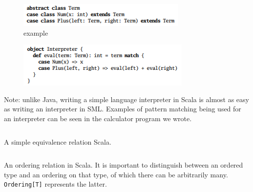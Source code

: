 \documentclass[jou,apacite]{IEEEtran}
\begin{document}
\begin{figure}[h]
  \centering
  \includegraphics[width=\columnwidth]{abstract_class}
  \caption{example}
  \label{fig:example}
\end{figure}

\begin{figure}[h]
  \centering
  \includegraphics[width=\columnwidth]{pattern_match}
  \caption{}
  \label{fig:example}
\end{figure}

Note: unlike Java, writing a simple language interpreter in Scala is almost as easy as writing an interpreter in SML. Examples of pattern matching being used for an interpreter can be seen in the calculator program we wrote.

\begin{listing}
  \inputminted[firstline=3, frame=single]{Scala}{../examples/Equiv.scala}
  \caption{A simple equivalence relation Scala.}
  \label{lst:equiv}
\end{listing}

\begin{listing}
  \inputminted[firstline=3, frame=single]{Scala}{../examples/Ord.scala}
  \caption{An ordering relation in Scala. It is important to distinguish between
    an ordered type and an ordering on that type, of which there can be
    arbitrarily many. \texttt{Ordering[T]} represents the latter.}
  \label{lst:ordering}
\end{listing}


\end{document}
